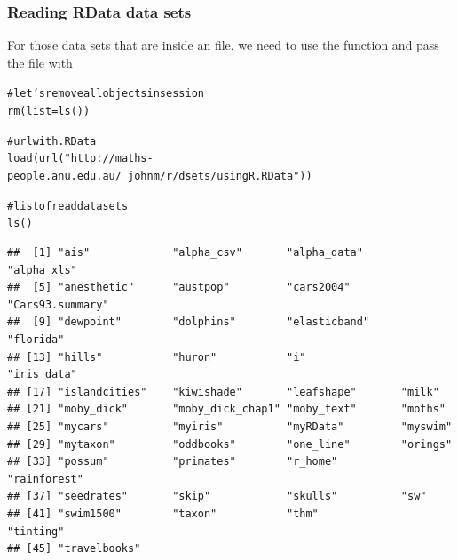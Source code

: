\documentclass{beamer}\usepackage[]{graphicx}\usepackage[]{color}
\makeatletter
\newcommand{\hlstr}[1]{\textcolor[rgb]{0.063,0.58,0.627}{#1}}%
\newcommand{\hlcom}[1]{\textcolor[rgb]{0.588,0.588,0.588}{#1}}%
\newcommand{\hlstd}[1]{\textcolor[rgb]{0.196,0.196,0.196}{#1}}%
\newcommand{\hlkwc}[1]{\textcolor[rgb]{0,0.631,0.314}{#1}}%
\newcommand{\hlkwd}[1]{\textcolor[rgb]{0.78,0.227,0.412}{#1}}%
\newenvironment{kframe}{%
 \def\at@end@of@kframe{}%
 \ifinner\ifhmode%
  \def\at@end@of@kframe{\end{minipage}}%
  \begin{minipage}{\columnwidth}%
 \fi\fi%
 \def\FrameCommand##1{\hskip\@totalleftmargin \hskip-\fboxsep
 \colorbox{shadecolor}{##1}\hskip-\fboxsep
     \hskip-\linewidth \hskip-\@totalleftmargin \hskip\columnwidth}%
 \MakeFramed {\advance\hsize-\width
   \@totalleftmargin\z@ \linewidth\hsize
   \@setminipage}}%
 {\par\unskip\endMakeFramed%
 \at@end@of@kframe}
\newenvironment{knitrout}{}{} %
\makeatother
\begin{document}
\begin{frame}[fragile]
\frametitle{Reading RData data sets}

For those data sets that are inside an  file, we need to use the function  and pass the file with 

\begin{knitrout}\tiny
{}\color{fgcolor}\begin{kframe}
\begin{alltt}
\hlcom{# let's remove all objects in session}
\hlkwd{rm}\hlstd{(}\hlkwc{list}  \hlstd{=} \hlkwd{ls}\hlstd{())}

\hlcom{# url with .RData}
\hlkwd{load}\hlstd{(}\hlkwd{url}\hlstd{(}\hlstr{"http://maths-people.anu.edu.au/~johnm/r/dsets/usingR.RData"}\hlstd{))}
\end{alltt}
\end{kframe}
\end{knitrout}

\begin{knitrout}\tiny
{}\color{fgcolor}\begin{kframe}
\begin{alltt}
\hlcom{# list of read data sets }
\hlkwd{ls}\hlstd{()}
\end{alltt}
\begin{verbatim}
##  [1] "ais"             "alpha_csv"       "alpha_data"      "alpha_xls"      
##  [5] "anesthetic"      "austpop"         "cars2004"        "Cars93.summary" 
##  [9] "dewpoint"        "dolphins"        "elasticband"     "florida"        
## [13] "hills"           "huron"           "i"               "iris_data"      
## [17] "islandcities"    "kiwishade"       "leafshape"       "milk"           
## [21] "moby_dick"       "moby_dick_chap1" "moby_text"       "moths"          
## [25] "mycars"          "myiris"          "myRData"         "myswim"         
## [29] "mytaxon"         "oddbooks"        "one_line"        "orings"         
## [33] "possum"          "primates"        "r_home"          "rainforest"     
## [37] "seedrates"       "skip"            "skulls"          "sw"             
## [41] "swim1500"        "taxon"           "thm"             "tinting"        
## [45] "travelbooks"
\end{verbatim}
\end{kframe}
\end{knitrout}

\end{frame}

\end{document}
